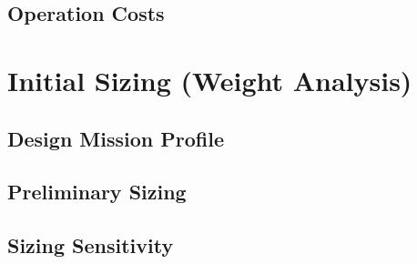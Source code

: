 \documentclass[12pt]{article}
\begin{document}
\subsection{Operation Costs}


\section{Initial Sizing (Weight Analysis)}
\subsection{Design Mission Profile}

\subsection{Preliminary Sizing}

\subsection{Sizing Sensitivity}

\clearpage
\printbibliography[heading=bibnumbered]
\end{document}
